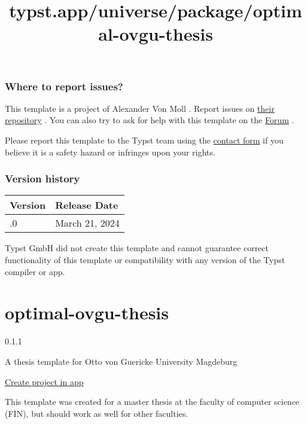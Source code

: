 \subsubsection{Where to report issues?}\label{where-to-report-issues}

This template is a project of Alexander Von Moll . Report issues on
\href{https://github.com/avonmoll/ifacconf-typst}{their repository} .
You can also try to ask for help with this template on the
\href{https://forum.typst.app}{Forum} .

Please report this template to the Typst team using the
\href{https://typst.app/contact}{contact form} if you believe it is a
safety hazard or infringes upon your rights.

\label{versions}
\subsubsection{Version history}\label{version-history}

\begin{longtable}[]{@{}ll@{}}
\toprule\noalign{}
Version & Release Date \\
\midrule\noalign{}
\endhead
\bottomrule\noalign{}
\endlastfoot
0.1.0 & March 21, 2024 \\
\end{longtable}

Typst GmbH did not create this template and cannot guarantee correct
functionality of this template or compatibility with any version of the
Typst compiler or app.


\title{typst.app/universe/package/optimal-ovgu-thesis}

\label{banner}
\label{template-thumbnail}

\section{optimal-ovgu-thesis}\label{optimal-ovgu-thesis}

{ 0.1.1 }

A thesis template for Otto von Guericke University Magdeburg

\href{/app?template=optimal-ovgu-thesis&version=0.1.1}{Create project in
app}

\label{readme}
This template was created for a master thesis at the faculty of computer
science (FIN), but should work as well for other faculties.


